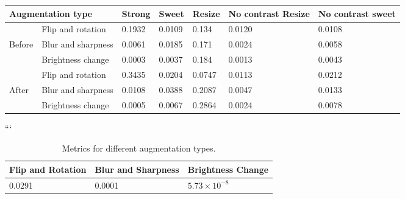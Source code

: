  \begin{table}
 \centering
 \begin{tabular}{ll*{5}{l}}
 \toprule
 \multicolumn{2}{l}{Augmentation type} & Strong & Sweet & Resize & No contrast Resize & No contrast sweet \\ 
 \midrule
 & Flip and rotation & 0.1932 & 0.0109 & 0.134 & 0.0120 & 0.0108 \\
 Before & Blur and sharpness & 0.0061 & 0.0185 & 0.171 & 0.0024 & 0.0058 \\
 & Brightness change & 0.0003 & 0.0037 & 0.184 & 0.0013 & 0.0043 \\
 \midrule
 & Flip and rotation & 0.3435 & 0.0204 & 0.0747 & 0.0113 & 0.0212 \\
 After & Blur and sharpness & 0.0108 & 0.0388 & 0.2087 & 0.0047 & 0.0133 \\
 & Brightness change & 0.0005 & 0.0067 & 0.2864 & 0.0024 & 0.0078 \\
 \bottomrule
 \end{tabular}
 \end{table}
 ```
    

 \begin{table}[H]
    \centering
    \begin{tabular}{@{}lll@{}}
    \toprule
    \textbf{Flip and Rotation} & \textbf{Blur and Sharpness} & \textbf{Brightness Change} \\ \midrule
    0.0291                     & 0.0001                     & $5.73 \times 10^{-8}$      \\ \bottomrule
    \end{tabular}
    \caption{Metrics for different augmentation types.}
    \label{tab:augmentation_metrics}
\end{table}
    



  